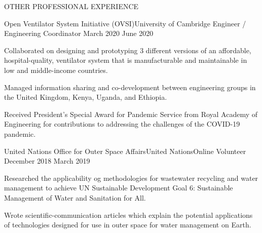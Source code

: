 \documentclass{resume} %
\begin{document}
\begin{rSection}{OTHER PROFESSIONAL EXPERIENCE }

\begin{rSubsection} {Open Ventilator System Initiative (OVSI)}{University of Cambridge}
 {Engineer / Engineering Coordinator }{March 2020 {\textendash} June 2020}
\item Collaborated on designing and prototyping 3 different versions of an affordable, hospital-quality, ventilator system that is manufacturable and maintainable in low and middle-income countries.
\item Managed information sharing and co-development between engineering groups in the United Kingdom, Kenya, Uganda, and Ethiopia.
\item Received President’s Special Award for Pandemic Service from Royal Academy of Engineering  for contributions to addressing the challenges of the COVID-19 pandemic. 
\end{rSubsection}

\begin{rSubsection}
{United Nations Office for Outer Space Affairs}{United Nations}{Online Volunteer}{	 December 2018 {\textendash} March 2019}

 \item Researched the applicability og methodologies for wastewater recycling and water management to achieve UN Sustainable Development Goal 6: Sustainable Management of Water and Sanitation for All.
 
\item   Wrote scientific-communication articles which explain the potential applications of technologies designed for use in outer space for water management on Earth.
\end{rSubsection}



\end{rSection}
\end{document}
